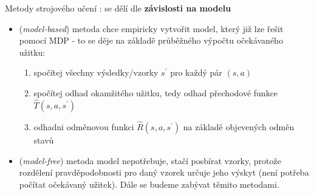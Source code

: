 Metody strojového učení \cite{RLIntro}: se dělí dle \textbf{závislosti na modelu}
\begin{itemize}
\item (\textit{model-based}) metoda chce empiricky vytvořit model, který již lze řešit pomocí MDP - to se děje na základě průběžného výpočtu očekávaného užitku: 
\begin{enumerate}
\item spočítej všechny výsledky/vzorky $s^\prime$ pro každý pár $(s,a)$
\item spočítej odhad okamžitého užitku, tedy odhad přechodové funkce $\hat{T}(s,a,s^\prime)$
\item odhadni odměnovou funkci $\hat{R}(s,a,s^\prime)$ na základě objevených odměn stavů
\end{enumerate}
\item (\textit{model-free}) metoda model nepotřebuje, stačí posbírat vzorky, protože rozdělení pravděpodobnosti pro daný vzorek určuje jeho výskyt (není potřeba počítat očekávaný užitek). Dále se budeme zabývat těmito metodami.
\end{itemize}

